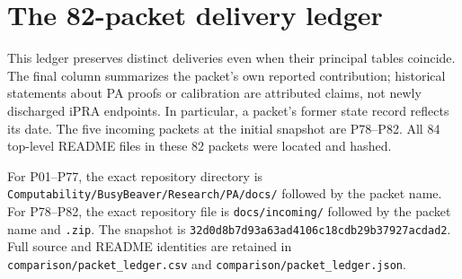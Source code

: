 \section{The 82-packet delivery ledger}

\label{app:packet-ledger}

This ledger preserves distinct deliveries even when their principal tables coincide. The final column summarizes the packet's own reported contribution; historical statements about PA proofs or calibration are attributed claims, not newly discharged iPRA endpoints. In particular, a packet's former state record reflects its date. The five incoming packets at the initial snapshot are P78--P82. All 84 top-level README files in these 82 packets were located and hashed.

For P01--P77, the exact repository directory is \nolinkurl{Computability/BusyBeaver/Research/PA/docs/} followed by the packet name. For P78--P82, the exact repository file is \nolinkurl{docs/incoming/} followed by the packet name and \nolinkurl{.zip}. The snapshot is \texttt{32d0d8b7d93a63ad4106c18cdb29b37927acdad2}. Full source and README identities are retained in \nolinkurl{comparison/packet_ledger.csv} and \nolinkurl{comparison/packet_ledger.json}.
\begingroup
\footnotesize
\setlength{\tabcolsep}{2pt}
\setlength{\LTleft}{0pt}
\setlength{\LTright}{0pt}
\renewcommand{\arraystretch}{1.12}
